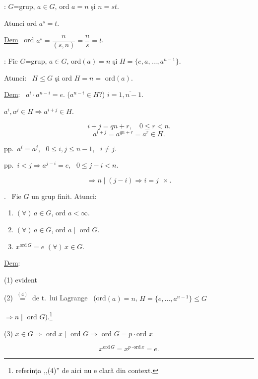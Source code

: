 \documentclass[12pt]{article}
\begin{document}
\noindent{}: $G$=grup, $a\in G$, ord $a=n$ şi $n=st$.

\noindent Atunci ord $a^s=t$.

\bigskip
\noindent\underline{Dem} \ ord $a^s = \dfrac{n}{(s,n)} = \dfrac{n}{s} = t$.

\bigskip
\noindent{}: Fie $G$=grup, $a\in G$, ord$(a)=n$ şi $H=\{e,a,\ldots,a^{n-1}\}$.

\noindent Atunci: \ $H\leq G$ şi ord $H=n=$ ord$(a)$.

\bigskip
\noindent\underline{Dem}: \ $a^i\cdot a^{n-i}=e$. \quad ($a^{n-i}\in H$?) \quad $i=\overline{1,n-1}$.

\bigskip
\noindent $a^i,a^j\in H \Rightarrow a^{i+j}\in H$.

\[
i+j=qn+r, \quad 0\leq r<n.
\]
\[
a^{i+j}=a^{qn+r}=a^r\in H.
\]

\bigskip
\noindent pp.\ $a^i=a^j$, \ $0\leq i,j\leq n-1$, \ $i\neq j$.

\noindent pp.\ $i<j \Rightarrow a^{j-i}=e$, \ $0\leq j-i<n$.

\[
\Rightarrow n\mid(j-i) \Rightarrow i=j \ \ \times.
\]

\bigskip
\noindent{}. \ Fie $G$ un grup finit. Atunci:

\begin{enumerate}
\item[(1)] $(\forall)\,a\in G$, ord $a<\infty$.
\item[(2)] $(\forall)\,a\in G$, ord $a\mid$ ord $G$.
\item[(3)] $x^{\text{ord}\,G}=e$ $(\forall)\,x\in G$.
\end{enumerate}

\bigskip
\noindent\underline{Dem}:

\noindent (1) evident

\noindent (2) $\overset{(4)}{=}$ de t.\ lui Lagrange \ (ord$(a)=n$, $H=\{e,\ldots,a^{n-1}\}\leq G$

\noindent $\Rightarrow n\mid$ ord $G$).\footnote{referința ,,(4)'' de aici nu e clară din context.}

\bigskip
\noindent (3) $x\in G \Rightarrow$ ord $x\mid$ ord $G \Rightarrow$ ord $G = p\cdot$ord $x$

\[
x^{\text{ord}\,G} = x^{p\cdot\text{ord}\,x} = e.
\]
\end{document}
